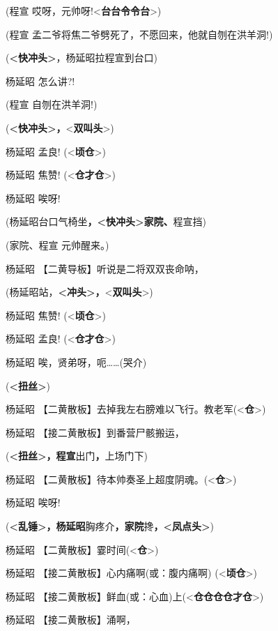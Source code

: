 (程宣 哎呀，元帅呀!\textless{}\textbf{台台令令台}\textgreater{})

(程宣 孟二爷将焦二爷劈死了，不愿回来，他就自刎在洪羊洞!)

(\textbf{\textless{}快冲头\textgreater{}}，杨延昭拉程宣到台口)

杨延昭 怎么讲?!

(程宣 自刎在洪羊洞!)

(\textbf{\textless{}快冲头\textgreater{}，}\textless{}\textbf{双叫头}\textgreater{})

杨延昭 孟良! (\textless{}\textbf{顷仓}\textgreater{})

杨延昭 焦赞! (\textless{}\textbf{仓才仓}\textgreater{})

杨延昭 唉呀!

(杨延昭台口气椅坐\textbf{，\textless{}快冲头\textgreater{}家院、}程宣挡)

(家院、程宣 元帅醒来。)

杨延昭 【二黄导板】听说是二将双双丧命呐，

(杨延昭站，\textbf{\textless{}冲头\textgreater{}，}\textless{}\textbf{双叫头}\textgreater{})

杨延昭 焦赞! (\textless{}\textbf{顷仓}\textgreater{})

杨延昭 孟良! (\textless{}\textbf{仓才仓}\textgreater{})

杨延昭 唉，贤弟呀，呃\ldots{}\ldots{}(哭介)

(\textbf{\textless{}扭丝\textgreater{}})

杨延昭
【二黄散板】去掉我左右膀难以飞行。教老军(\textless{}\textbf{仓}\textgreater{})

杨延昭 【接二黄散板】到番营尸骸搬运，

(\textbf{\textless{}扭丝\textgreater{}，程宣}出门\textbf{，}上场门下)

杨延昭
【二黄散板】待本帅奏圣上超度阴魂。(\textless{}\textbf{仓}\textgreater{})

杨延昭 唉呀!

(\textbf{\textless{}乱锤\textgreater{}，杨延昭}胸疼介\textbf{，家院}搀\textbf{，\textless{}凤点头\textgreater{}})

杨延昭 【二黄散板】霎时间(\textless{}\textbf{仓}\textgreater{})

杨延昭 【接二黄散板】心内痛啊(或：腹内痛啊)
(\textless{}\textbf{顷仓}\textgreater{})

杨延昭
【接二黄散板】鲜血(或：心血)上(\textless{}\textbf{仓仓仓仓才仓}\textgreater{})

杨延昭 【接二黄散板】涌啊，

